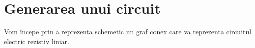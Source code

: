 \documentclass[12pt, a4paper]{article}
\title{\centering{Electrotehnica în profunzime\\
                    Tema de casă}}
\author{\textbf{Negru Mihai}\\
        Grupa 313CD, Anul 1\\
        email \href{mailto:mihai.upb.info2021@gmail.com}{mihai.upb.info2021@gmail.com}\\
        Universitatea Politehnica București\\
        Facultatea de Automatică și Calculatoare\\
        Calculatoare și Tehnologiile Informației}
\date{Mai 2022}
\begin{document}
\maketitle
\newpage
\tableofcontents{}
\newpage

\section{Generarea unui circuit}
Vom începe prin a reprezenta schemetic un graf conex care va reprezenta circuitul electric rezistiv liniar.

\begin{center}
    \begin{tikzpicture}[x=0.75pt,y=0.75pt,yscale=-1,xscale=1]
    
    

\end{tikzpicture}
\end{center}
\end{document}
